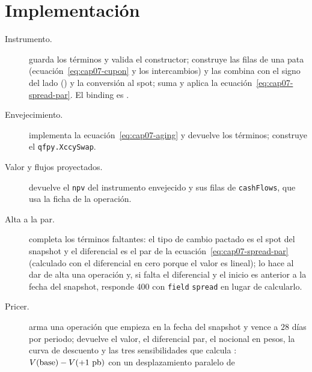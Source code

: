 \section{Implementación}\label{sec:cap07-implementacion}

\begin{description}
  \item[Instrumento.]  guarda los términos y valida
    el constructor;  construye las filas de una pata
    (ecuación~\eqref{eq:cap07-cupon} y los intercambios) y  las
    combina con el signo del lado () y la conversión
    al spot;  suma y
     aplica la ecuación~\eqref{eq:cap07-spread-par}.
    El binding es .
  \item[Envejecimiento.]  implementa la
    ecuación~\eqref{eq:cap07-aging} y devuelve los términos;
     construye el \texttt{qfpy.XccySwap}.
  \item[Valor y flujos proyectados.]  devuelve el \texttt{npv} del
    instrumento envejecido y  sus filas de \texttt{cashFlows}, que usa la ficha
    de la operación.
  \item[Alta a la par.]  completa los términos faltantes: el tipo de cambio
    pactado es el spot del snapshot y el diferencial es el par de la ecuación~\eqref{eq:cap07-spread-par}
    (calculado con el diferencial en cero porque el valor es lineal);
     lo hace al dar de alta una operación y, si falta el diferencial y el inicio es
    anterior a la fecha del snapshot, responde 400 con \texttt{field} \texttt{spread} en lugar de calcularlo.
  \item[Pricer.]  arma una operación que empieza en la fecha del
    snapshot y vence a $28$ días por periodo;  devuelve el valor, el
    diferencial par, el nocional en pesos, la curva de descuento y las tres sensibilidades que calcula
    : $V(\text{base})-V(+1~\textup{pb})$ con un desplazamiento paralelo de

\end{description}
